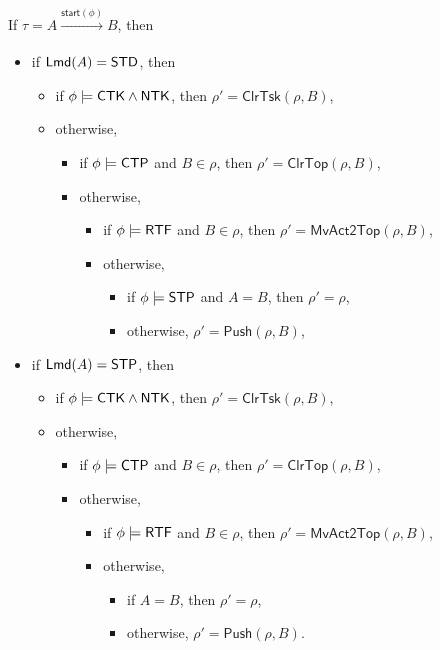 \documentclass[preprint,12pt]{elsarticle}
\newcommand\lmd{{\sf Lmd}}
\newcommand\standard{{\sf STD}}
\newcommand\singletop{{\sf STP}}
\newcommand\ntkflag{{\sf NTK}}
\newcommand\ctpflag{{\sf CTP}}
\newcommand\stpflag{{\sf STP}}
\newcommand\ctkflag{{\sf CTK}}
\newcommand\rtfflag{{\sf RTF}}
\newcommand\startactivity{{\mathsf{start} }}
\newcommand\push{\mathsf{Push}}
\newcommand\mvacttop{\mathsf{MvAct2Top}}
\newcommand\clrtop{\mathsf{ClrTop}}
\newcommand\clrtsk{\mathsf{ClrTsk}}
\begin{document}
If $\tau = A\xrightarrow[]{\startactivity(\phi)}B$, then
\begin{itemize}
\item if $\lmd(A) = \standard$, then
\begin{itemize}
	\item if $\phi\models\ctkflag\wedge\ntkflag$, then $\rho' = \clrtsk(\rho, B)$,
	\item otherwise,
	\begin{itemize}
		\item if $\phi \models\ctpflag$ and $B \in \rho$, then $\rho' =\clrtop(\rho, B)$,
		\item otherwise,
		\begin{itemize}
			\item if $\phi \models \rtfflag$ and $B \in \rho$, then $\rho'=\mvacttop(\rho, B)$,
			\item otherwise,
			\begin{itemize}
				\item if $\phi \models \stpflag$ and $A = B$, then $\rho' = \rho$,
				\item otherwise, $\rho' = \push(\rho, B)$,
			\end{itemize}
		\end{itemize}
	\end{itemize}
\end{itemize}
\item if $\lmd(A) = \singletop$, then 
\begin{itemize}
	\item if $\phi\models\ctkflag\wedge\ntkflag$, then $\rho' = \clrtsk(\rho, B)$,
	\item otherwise,
	\begin{itemize}
		\item if $\phi \models\ctpflag$ and $B \in \rho$, then $\rho' =\clrtop(\rho, B)$,
		\item otherwise,
		\begin{itemize}
			\item if $\phi \models \rtfflag$ and $B \in \rho$, then $\rho'=\mvacttop(\rho, B)$,
			\item otherwise,
			\begin{itemize}
				\item if $A = B$, then $\rho' = \rho$,
				\item otherwise, $\rho' = \push(\rho, B)$.
			\end{itemize}
		\end{itemize}
	\end{itemize}
\end{itemize}
\end{itemize}
\end{document}
